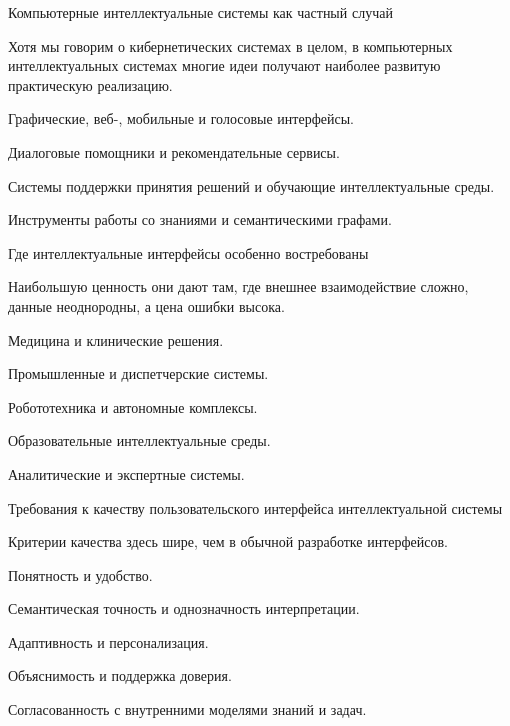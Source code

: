\begin{frame}{Компьютерные интеллектуальные системы как частный случай}
	\topline
	\justifying

	Хотя мы говорим о кибернетических системах в целом, в компьютерных интеллектуальных системах многие идеи получают наиболее развитую практическую реализацию.
	
	\begin{textitemize}
		\item Графические, веб-, мобильные и голосовые интерфейсы.
		\item Диалоговые помощники и рекомендательные сервисы.
		\item Системы поддержки принятия решений и обучающие интеллектуальные среды.
		\item Инструменты работы со знаниями и семантическими графами.
	\end{textitemize}
\end{frame}

\begin{frame}{Где интеллектуальные интерфейсы особенно востребованы}
	\topline
	\justifying

	Наибольшую ценность они дают там, где внешнее взаимодействие сложно, данные неоднородны, а цена ошибки высока.
	
	\begin{textitemize}
		\item Медицина и клинические решения.
		\item Промышленные и диспетчерские системы.
		\item Робототехника и автономные комплексы.
		\item Образовательные интеллектуальные среды.
		\item Аналитические и экспертные системы.
	\end{textitemize}
\end{frame}

\begin{frame}{Требования к качеству пользовательского интерфейса интеллектуальной системы}
	\topline
	\justifying

	Критерии качества здесь шире, чем в обычной разработке интерфейсов.
	
	\begin{textitemize}
		\item Понятность и удобство.
		\item Семантическая точность и однозначность интерпретации.
		\item Адаптивность и персонализация.
		\item Объяснимость и поддержка доверия.
		\item Согласованность с внутренними моделями знаний и задач.
	\end{textitemize}
\end{frame}

